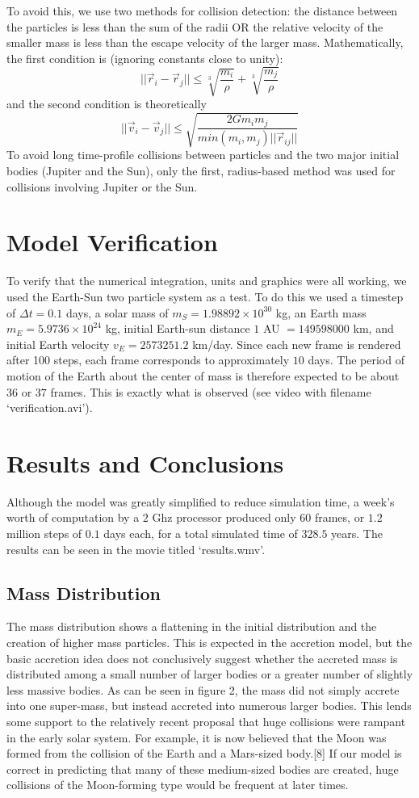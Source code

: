 \documentclass{article}
\begin{document}
To avoid this, we use two methods for collision detection: the distance between the particles is less than the sum of the radii OR the relative velocity of the smaller mass is less than the escape velocity of the larger mass. Mathematically, the first condition is (ignoring constants close to unity):
\[||\vec{r}_i - \vec{r}_j|| \leq \sqrt[3]{\frac{m_i}{\rho}} + \sqrt[3]{\frac{m_j}{\rho}}\]
and the second condition is theoretically
\[||\vec{v}_i - \vec{v}_j|| \leq \sqrt{\frac{2Gm_i m_j}{min(m_i,m_j) ||\vec{r}_{ij}|| }}\]
To avoid long time-profile collisions between particles and the two major initial bodies (Jupiter and the Sun), only the first, radius-based method was used for collisions involving Jupiter or the Sun.

\section{Model Verification}
To verify that the numerical integration, units and graphics were all working, we used the Earth-Sun two particle system as a test. To do this we used a timestep of $\Delta t = 0.1$ days, a solar mass of $m_S = 1.98892 \times 10^{30}$ kg, an Earth mass $m_E = 5.9736 \times 10^{24}$ kg, initial Earth-sun distance $1$ AU $= 149598000$ km, and initial Earth velocity $v_E = 2573251.2$ km/day. Since each new frame is rendered after 100 steps, each frame corresponds to approximately $10$ days. The period of motion of the Earth about the center of mass is therefore expected to be about $36$ or $37$ frames. This is exactly what is observed (see video with filename `verification.avi').

\section{Results and Conclusions}
Although the model was greatly simplified to reduce simulation time, a week's worth of computation by a $2$ Ghz processor produced only 60 frames, or $1.2$ million steps of $0.1$ days each, for a total simulated time of $328.5$ years. The results can be seen in the movie titled `results.wmv'.

\subsection{Mass Distribution}
The mass distribution shows a flattening in the initial distribution and the creation of higher mass particles. This is expected in the accretion model, but the basic accretion idea does not conclusively suggest whether the accreted mass is distributed among a small number of larger bodies or a greater number of slightly less massive bodies. As can be seen in figure 2, the mass did not simply accrete into one super-mass, but instead accreted into numerous larger bodies. This lends some support to the relatively recent proposal that huge collisions were rampant in the early solar system. For example, it is now believed that the Moon was formed from the collision of the Earth and a Mars-sized body.[8] If our model is correct in predicting that many of these medium-sized bodies are created, huge collisions of the Moon-forming type would be frequent at later times.
\end{document}
